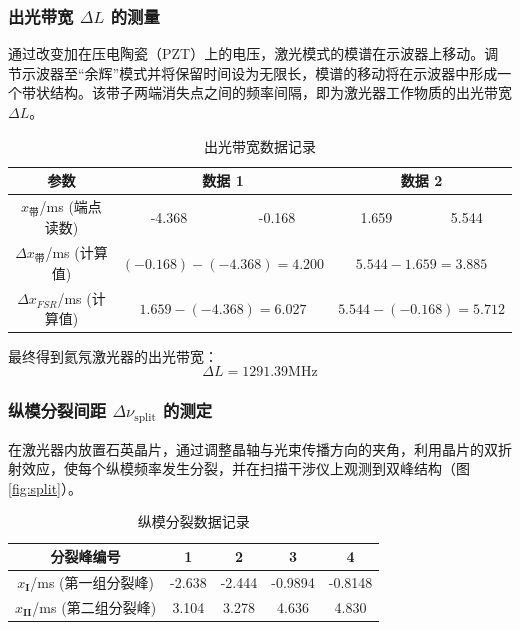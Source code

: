 \documentclass[a4paper, 1.5lines]{ctexart}
\begin{document}
\subsubsection{出光带宽 $\Delta L$ 的测量}

通过改变加在压电陶瓷（PZT）上的电压，激光模式的模谱在示波器上移动。调节示波器至“余辉”模式并将保留时间设为无限长，模谱的移动将在示波器中形成一个带状结构。该带子两端消失点之间的频率间隔，即为激光器工作物质的出光带宽 $\Delta L$。

\begin{table}[h!]
    \centering
    \caption{出光带宽数据记录}
    \label{tab:bandwidth_data}
    \begin{tabular}{|c|c|c|c|c|}
    \hline
    \textbf{参数} & \multicolumn{2}{|c|}{\textbf{数据 1}} & \multicolumn{2}{|c|}{\textbf{数据 2}} \\
    \hline
    $x_{\text{带}}$/ms (端点读数) & -4.368 & -0.168 & 1.659 & 5.544 \\
    \hline
    $\Delta x_{\text{带}}$/ms (计算值) & \multicolumn{2}{|c|}{$(-0.168)-(-4.368)=4.200$} & \multicolumn{2}{|c|}{$5.544-1.659= 3.885$} \\
    \hline
    $\Delta x_{FSR}$/ms (计算值) & \multicolumn{2}{|c|}{$1.659 - (-4.368) = 6.027$} & \multicolumn{2}{|c|}{$5.544- (-0.168) = 5.712$} \\
    \hline
    \end{tabular}
\end{table}

最终得到氦氖激光器的出光带宽：
$$
\Delta L = 1291.39 \mathrm{MHz}
$$

\subsubsection{纵模分裂间距 $\Delta \nu_{\text{split}}$ 的测定}

在激光器内放置石英晶片，通过调整晶轴与光束传播方向的夹角，利用晶片的双折射效应，使每个纵模频率发生分裂，并在扫描干涉仪上观测到双峰结构（图\ref{fig:split}）。

\begin{table}[h!]
    \centering
    \caption{纵模分裂数据记录}
    \label{tab:split_data}
    \begin{tabular}{|c|c|c|c|c|}
    \hline
    \textbf{分裂峰编号} & 1 & 2 & 3 & 4 \\
    \hline
    $x_{\mathbf{I}}$/ms (第一组分裂峰) & -2.638 & -2.444 & -0.9894 & -0.8148 \\
    \hline
    $x_{\mathbf{II}}$/ms (第二组分裂峰) & 3.104 & 3.278 & 4.636 & 4.830 \\
    \hline
    \end{tabular}
\end{table}
\end{document}
